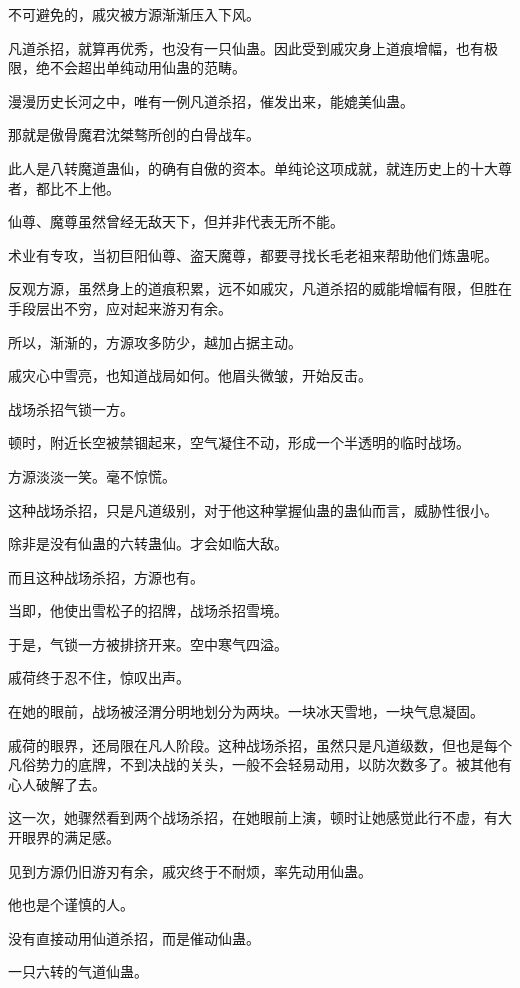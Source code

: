 \begin{this_body}
不可避免的，戚灾被方源渐渐压入下风。

凡道杀招，就算再优秀，也没有一只仙蛊。因此受到戚灾身上道痕增幅，也有极限，绝不会超出单纯动用仙蛊的范畴。

漫漫历史长河之中，唯有一例凡道杀招，催发出来，能媲美仙蛊。

那就是傲骨魔君沈桀骜所创的白骨战车。

此人是八转魔道蛊仙，的确有自傲的资本。单纯论这项成就，就连历史上的十大尊者，都比不上他。

仙尊、魔尊虽然曾经无敌天下，但并非代表无所不能。

术业有专攻，当初巨阳仙尊、盗天魔尊，都要寻找长毛老祖来帮助他们炼蛊呢。

反观方源，虽然身上的道痕积累，远不如戚灾，凡道杀招的威能增幅有限，但胜在手段层出不穷，应对起来游刃有余。

所以，渐渐的，方源攻多防少，越加占据主动。

戚灾心中雪亮，也知道战局如何。他眉头微皱，开始反击。

战场杀招气锁一方。

顿时，附近长空被禁锢起来，空气凝住不动，形成一个半透明的临时战场。

方源淡淡一笑。毫不惊慌。

这种战场杀招，只是凡道级别，对于他这种掌握仙蛊的蛊仙而言，威胁性很小。

除非是没有仙蛊的六转蛊仙。才会如临大敌。

而且这种战场杀招，方源也有。

当即，他使出雪松子的招牌，战场杀招雪境。

于是，气锁一方被排挤开来。空中寒气四溢。

戚荷终于忍不住，惊叹出声。

在她的眼前，战场被泾渭分明地划分为两块。一块冰天雪地，一块气息凝固。

戚荷的眼界，还局限在凡人阶段。这种战场杀招，虽然只是凡道级数，但也是每个凡俗势力的底牌，不到决战的关头，一般不会轻易动用，以防次数多了。被其他有心人破解了去。

这一次，她骤然看到两个战场杀招，在她眼前上演，顿时让她感觉此行不虚，有大开眼界的满足感。

见到方源仍旧游刃有余，戚灾终于不耐烦，率先动用仙蛊。

他也是个谨慎的人。

没有直接动用仙道杀招，而是催动仙蛊。

一只六转的气道仙蛊。


\end{this_body}
